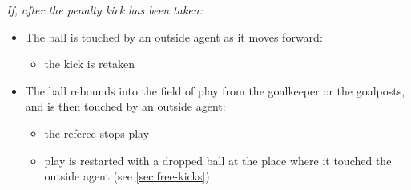 \textit{If, after the penalty kick has been taken:}
\begin{itemize}
\item The ball is touched by an outside agent as it moves forward:
  \begin{itemize}
  \item the kick is retaken
  \end{itemize}

\item The ball rebounds into the field of play from the goalkeeper or the goalposts, and is then touched by an outside agent:
  \begin{itemize}
  \item the referee stops play
  \item play is restarted with a dropped ball at the place where it touched the outside agent (see \autoref{sec:free-kicks})
  \end{itemize}
\end{itemize}